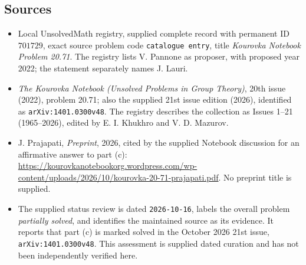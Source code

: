 \documentclass[11pt]{article}
\begin{document}
\subsection{Sources}
\begin{itemize}
\item Local UnsolvedMath registry, supplied complete record with permanent ID \(701729\), exact source problem code \texttt{catalogue entry}, title \emph{Kourovka Notebook Problem 20.71}. The registry lists V. Pannone as proposer, with proposed year 2022; the statement separately names J. Lauri.
\item \emph{The Kourovka Notebook (Unsolved Problems in Group Theory)}, 20th issue (2022), problem 20.71; also the supplied 21st issue edition (2026), identified as \texttt{arXiv:1401.0300v48}. The registry describes the collection as Issues 1--21 (1965--2026), edited by E. I. Khukhro and V. D. Mazurov.
\item J. Prajapati, \emph{Preprint}, 2026, cited by the supplied Notebook discussion for an affirmative answer to part (c): \url{https://kourovkanotebookorg.wordpress.com/wp-content/uploads/2026/10/kourovka-20-71-prajapati.pdf}. No preprint title is supplied.
\item The supplied status review is dated \texttt{2026-10-16}, labels the overall problem \emph{partially solved}, and identifies the maintained source as its evidence. It reports that part (c) is marked solved in the October 2026 21st issue, \texttt{arXiv:1401.0300v48}. This assessment is supplied dated curation and has not been independently verified here.
\end{itemize}
\end{document}
